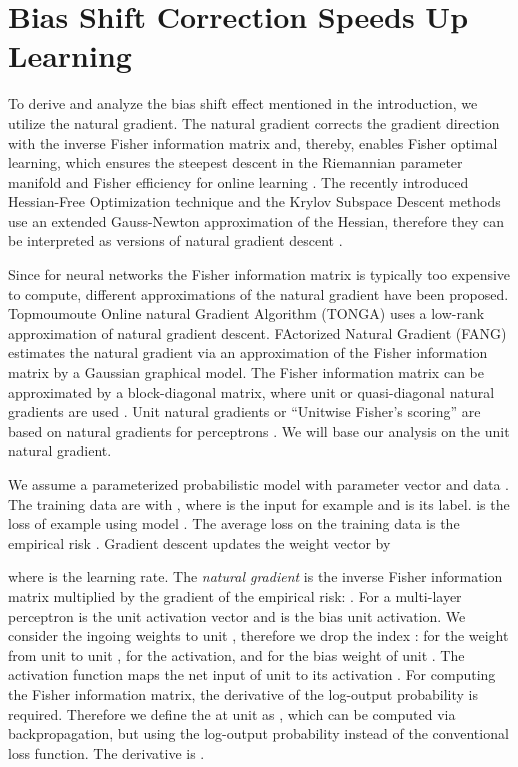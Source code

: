 \documentclass{article}
\begin{document}
\section{Bias Shift Correction Speeds Up Learning}
\label{sec:naturalGradient}
To derive and analyze the bias shift effect mentioned in
the introduction, we utilize the natural gradient.
The natural gradient corrects the gradient direction with
the inverse Fisher information matrix and, thereby, enables
Fisher optimal learning, which ensures
the steepest descent in the Riemannian parameter manifold
and Fisher efficiency for online learning \citep{Amari:98}.
The recently introduced Hessian-Free Optimization
technique \citep{Martens:10}
and the Krylov Subspace Descent methods \citep{Vinyals:12}
use an extended Gauss-Newton approximation of the Hessian,
therefore they can be interpreted as versions of natural
gradient descent \citep{Pascanu:14}.


Since for neural networks the
Fisher information matrix is typically too expensive to compute,
different approximations
of the natural gradient have been proposed.
Topmoumoute Online natural Gradient
Algorithm (TONGA) \citep{LeRoux:08} uses a
low-rank approximation of natural gradient descent.
FActorized Natural Gradient (FANG) \citep{Grosse:15}
estimates the natural gradient via an approximation of
the Fisher information matrix by a Gaussian graphical model.
The Fisher information matrix can be approximated by a block-diagonal matrix,
where unit or quasi-diagonal natural gradients are used \citep{Olivier:13}.
Unit natural gradients or ``Unitwise Fisher's scoring'' \citep{Kurita:93}
are based on natural gradients for perceptrons \citep{Amari:98,Yang:98}.
We will base our analysis on the unit natural gradient.

We assume a parameterized probabilistic model 
with parameter vector  and data .
The training data are  with
, where  is the
input for example  and  is its label.
 is the loss of example  using model
. The average loss on the
training data  is the empirical risk .
Gradient descent updates the
weight vector  by

where  is the learning rate.
The {\em natural gradient} is the inverse Fisher
information matrix  multiplied by the gradient of the empirical
risk:
.
For a  multi-layer perceptron
 is the unit activation vector and  is the
bias unit activation.
We consider the ingoing weights to unit , therefore we drop the
index :  for the weight from unit 
to unit ,  for the activation, and  for the bias weight of unit .
The activation function  maps
the net input  of unit  to its activation
.
For computing the Fisher information matrix, the derivative of
the log-output probability
 is required.
Therefore we define the  at unit  as
,
which can be computed via backpropagation, but using
the log-output probability instead of the conventional loss function.
The derivative is
.
\end{document}
